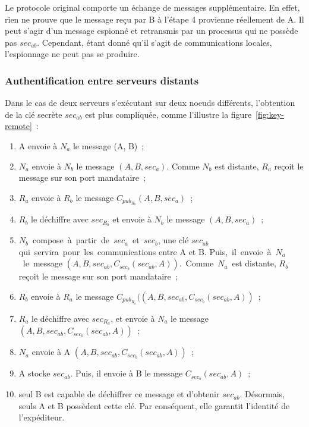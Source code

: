 Le protocole original comporte un \'echange de messages suppl\'ementaire. En effet, rien ne prouve que le message re\c{c}u par B \`a l'\'etape 4 provienne r\'eellement de A. Il peut s'agir d'un message espionn\'e et retransmis par un processus qui ne poss\`ede pas \(sec_{ab}\). Cependant, \'etant donn\'e qu'il s'agit de communications locales, l'espionnage ne peut pas se produire.

\subsubsection{Authentification entre serveurs distants}

Dans le cas de deux serveurs s'ex\'ecutant sur deux noeuds diff\'erents, l'obtention de la cl\'e secr\`ete \(sec_{ab}\) est plus compliqu\'ee, comme l'illustre la figure~\ref{fig:key-remote}~:


\begin{enumerate}
\item A envoie \`a \(N_{a}\) le message (A, B)~;
\item \(N_{a}\) envoie \`a \(N_{b}\) le message \((A,B, sec_{a})\). Comme \(N_{b}\) est distante, \(R_{a}\) re\c{c}oit le message sur son port mandataire~;
\item \(R_{a}\) envoie \`a \(R_{b}\) le message \(C_{pub_{R_{b}}}(A, B, sec_{a})\)~;
\item  \(R_{b}\) le d\'echiffre avec \(sec_{R_{b}}\) et envoie \`a \(N_{b}\) le message \((A, B, sec_{a})\)~;
\item \(N_{b}\)~compose~\`a~partir~de~\(sec_{a}\)~et~\(sec_{b}\), une cl\'e \(sec_{ab}\) qui~servira~pour~les~communications entre A et B. Puis,~il~envoie~\`a~\(N_{a}\)~le~message \((A, B, sec_{ab}, C_{sec_{b}}(sec_{ab}, A))\).~Comme~\(N_{a}\)~est distante, \(R_{b}\) re\c{c}oit le message sur son port mandataire~;
\item \(R_{b}\) envoie \`a \(R_{a}\) le message \(C_{pub_{R_{a}}}((A, B, sec_{ab}, C_{sec_{b}}(sec_{ab}, A))\)~;
\item \(R_{a}\) le d\'echiffre avec \(sec_{R_{a}}\), et envoie \`a \(N_{a}\) le message \((A, B, sec_{ab}, C_{sec_{b}}(sec_{ab}, A))\)~;
\item \(N_{a}\) envoie \`a A \((A, B, sec_{ab}, C_{sec_{b}}(sec_{ab}, A))\)~;
\item A  stocke \(sec_{ab}\). Puis, il envoie \`a B le message \(C_{sec_{b}}(sec_{ab}, A)\)~;
\item seul B est capable de d\'echiffrer ce message et d'obtenir \(sec_{ab}\). 
D\'esormais, seuls A et B poss\`edent cette cl\'e. Par cons\'equent, elle 
garantit l'identit\'e de l'exp\'editeur.
\end{enumerate}


